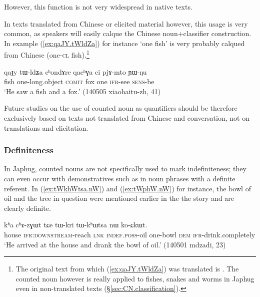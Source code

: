 However, this function is not very widespread in native texts.

In texts translated from Chinese or elicited material however, this usage is very common, as speakers will easily calque the Chinese noun+classifier construction. In example (\ref{ex:qaJY.tWldZa}) for instance  `one fish' is very probably calqued from Chinese   (one-\textsc{cl} fish).\footnote{The original text from which (\ref{ex:qaJY.tWldZa}) was translated is . The counted noun  however is really applied to fishes, snakes and worms in Japhug even in non-translated texts (§\ref{sec:CN.classification}).  } 

\begin{exe}
	\ex \label{ex:qaJY.tWldZa}
	\gll qaɟy tɯ-ldʑa cʰondɤre qacʰɣa ci pjɤ-mto ɲɯ-ŋu \\
	fish one-long.object \textsc{comit} fox one \textsc{ifr}-see \textsc{sens}-be \\
	\glt `He saw a fish and a fox.' (140505 xiaohaitu-zh, 41)
\end{exe} 

Future studies on the use of counted noun as quantifiers should be therefore exclusively based on texts not translated from Chinese and conversation, not on translations and elicitation.


\subsubsection{Definiteness} \label{sec:CN.definiteness}
In Japhug, counted nouns are not specifically used to mark indefiniteness; they can even occur with demonstratives such as  in noun phrases with a definite referent. In  (\ref{ex:tWkhWtsa.nW}) and (\ref{ex:tWphW.nW}) for instance, the bowl of oil and the tree in question were mentioned earlier in the  the story and are clearly definite.

\begin{exe}
	\ex \label{ex:tWkhWtsa.nW}
	\gll kʰa cʰɤ-zɣɯt tɕe tɯ-kri tɯ-kʰɯtsa nɯ ko-ɕkɯt.  \\
	house \textsc{ifr}:\textsc{downstream}-reach \textsc{lnk} \textsc{indef}.\textsc{poss}-oil one-bowl \textsc{dem} \textsc{ifr}-drink.completely \\
	\glt `He arrived at the house and drank the bowl of oil.' (140501 mdzadi, 23)
\end{exe}

